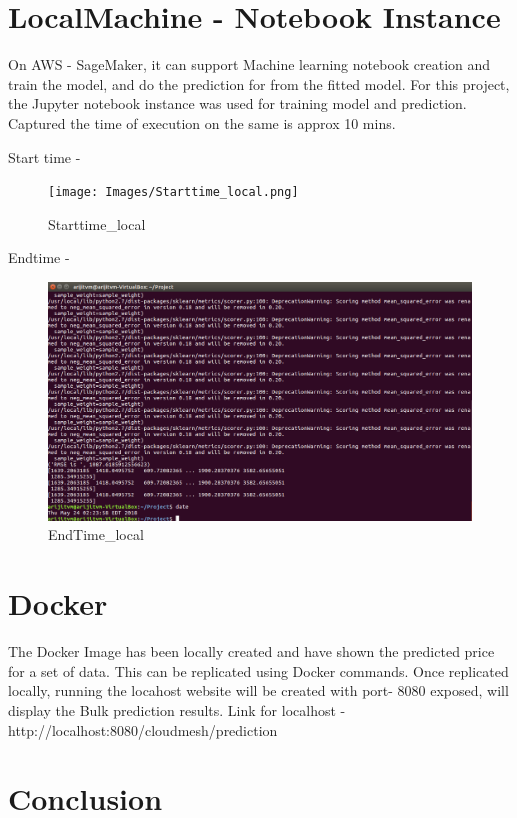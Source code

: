 \section{LocalMachine - Notebook Instance}

On AWS - SageMaker, it can support Machine learning notebook creation and train the model,
and do the prediction for from the fitted model. For this project, the Jupyter notebook instance was
used for training model and prediction.
Captured the time of execution on the same is approx 10 mins.

Start time -
\begin{figure}[pic11]
	\centering\texttt{[image: Images/Starttime\_local.png]}
	\caption{Starttime_local}\label{fig:Starttime_local}
\end{figure}

Endtime - 
\begin{figure}[pic12]
	\centering\includegraphics[width=\columnwidth]{Images/EndTime_local.png}
	\caption{EndTime_local}\label{fig:EndTime_local}
\end{figure}

\section{Docker}

The Docker Image has been locally created and have shown the predicted price for a 
set of data. This can be replicated using Docker commands. Once replicated locally, running the 
locahost website will be created with port- 8080 exposed, will display the Bulk prediction results.
Link for localhost - http://localhost:8080/cloudmesh/prediction

\section{Conclusion}

